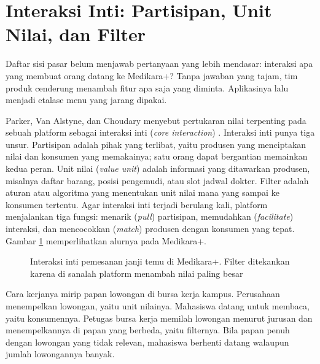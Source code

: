 \section{Interaksi Inti: Partisipan, Unit Nilai, dan Filter}

Daftar sisi pasar belum menjawab pertanyaan yang lebih mendasar: interaksi apa
yang membuat orang datang ke Medikara+? Tanpa jawaban yang tajam, tim produk
cenderung menambah fitur apa saja yang diminta. Aplikasinya lalu menjadi
etalase menu yang jarang dipakai.

Parker, Van Alstyne, dan Choudary menyebut pertukaran nilai terpenting pada
sebuah platform sebagai interaksi inti (\textit{core interaction})
\cite{parker2016platform}. Interaksi inti punya tiga unsur. Partisipan adalah
pihak yang terlibat, yaitu produsen yang menciptakan nilai dan konsumen yang
memakainya; satu orang dapat bergantian memainkan kedua peran. Unit nilai
(\textit{value unit}) adalah informasi yang ditawarkan produsen, misalnya
daftar barang, posisi pengemudi, atau slot jadwal dokter. Filter adalah aturan
atau algoritma yang menentukan unit nilai mana yang sampai ke konsumen
tertentu. Agar interaksi inti terjadi berulang kali, platform menjalankan tiga
fungsi: menarik (\textit{pull}) partisipan, memudahkan (\textit{facilitate})
interaksi, dan mencocokkan (\textit{match}) produsen dengan konsumen yang
tepat. Gambar \ref{fig:ch02-interaksi-inti} memperlihatkan alurnya pada
Medikara+.

\begin{figure}[!htb]
  \centering
  
  \caption{Interaksi inti pemesanan janji temu di Medikara+. Filter ditekankan
           karena di sanalah platform menambah nilai paling besar}
  \label{fig:ch02-interaksi-inti}
\end{figure}

Cara kerjanya mirip papan lowongan di bursa kerja kampus. Perusahaan
menempelkan lowongan, yaitu unit nilainya. Mahasiswa datang untuk membaca,
yaitu konsumennya. Petugas bursa kerja memilah lowongan menurut jurusan dan
menempelkannya di papan yang berbeda, yaitu filternya. Bila papan penuh dengan
lowongan yang tidak relevan, mahasiswa berhenti datang walaupun jumlah
lowongannya banyak.

